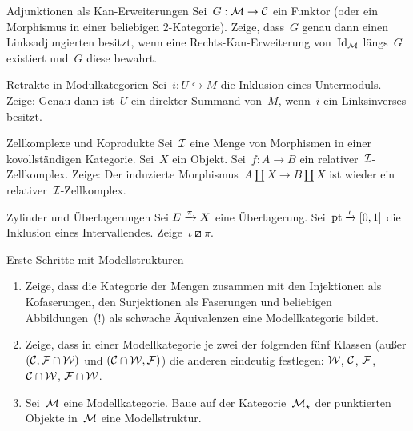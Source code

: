 \documentclass{uebblatt}
\begin{document}

\begin{aufgabe}{Adjunktionen als Kan-Erweiterungen}
Sei~$G : \mathcal{M} \to \mathcal{C}$ ein Funktor (oder ein Morphismus in einer beliebigen
2-Kategorie). Zeige, dass~$G$ genau dann einen Linksadjungierten besitzt, wenn
eine Rechts-Kan-Erweiterung von~$\mathrm{Id}_{\mathcal{M}}$ längs~$G$ existiert und~$G$ diese
bewahrt.
\end{aufgabe}

\begin{aufgabe}{Retrakte in Modulkategorien}
Sei~$i : U \hookrightarrow M$ die Inklusion eines Untermoduls. Zeige: Genau
dann ist~$U$ ein direkter Summand von~$M$, wenn~$i$ ein Linksinverses besitzt.
\end{aufgabe}

\begin{aufgabe}{Zellkomplexe und Koprodukte}
Sei~$\mathcal{I}$ eine Menge von Morphismen in einer kovollständigen Kategorie.
Sei~$X$ ein Objekt. Sei~$f : A \to B$ ein relativer~$\mathcal{I}$-Zellkomplex. Zeige: Der
induzierte Morphismus~$A \amalg X \to B \amalg X$ ist wieder ein
relativer~$\mathcal{I}$-Zellkomplex.
\end{aufgabe}

\begin{aufgabe}{Zylinder und Überlagerungen}
Sei $E \xrightarrow{\pi} X$ eine Überlagerung. Sei~$\mathrm{pt} \xrightarrow{\iota} [0,1]$ die
Inklusion eines Intervallendes. Zeige~$\iota \boxslash \pi$.
\end{aufgabe}
\vspace{-1em}

\begin{aufgabe}{Erste Schritte mit Modellstrukturen}
\begin{enumerate}
\item Zeige, dass die Kategorie der Mengen zusammen mit den Injektionen als
Kofaserungen, den Surjektionen als Faserungen und beliebigen Abbildungen~(!)
als schwache Äquivalenzen eine Modellkategorie bildet.
\item Zeige, dass in einer Modellkategorie je zwei der folgenden fünf Klassen
(außer $(\mathcal{C},\mathcal{F} \cap \mathcal{W})$ und $(\mathcal{C} \cap \mathcal{W},\mathcal{F})$) die anderen eindeutig
festlegen: $\mathcal{W}$, $\mathcal{C}$, $\mathcal{F}$, $\mathcal{C} \cap \mathcal{W}$, $\mathcal{F} \cap \mathcal{W}$.
\item Sei~$\mathcal{M}$ eine Modellkategorie. Baue auf der Kategorie~$\mathcal{M}_\star$ der
punktierten Objekte in~$\mathcal{M}$ eine Modellstruktur.
\end{enumerate}
\end{aufgabe}
\end{document}

